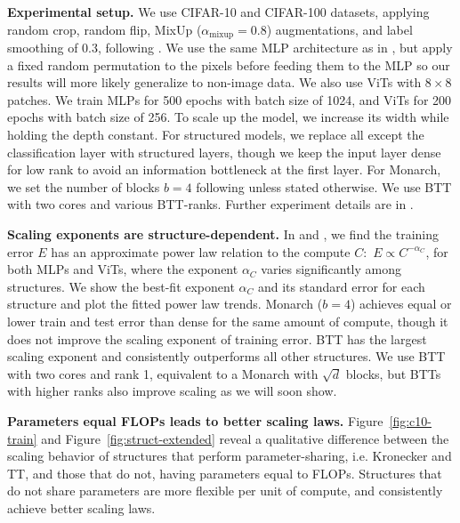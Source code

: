 \documentclass{article}
\theoremstyle{plain}
\theoremstyle{definition}
\theoremstyle{remark}
\begin{document}
\noindent \textbf{Experimental setup.} \quad We use CIFAR-10 and CIFAR-100 datasets, applying random crop, random flip, MixUp ($\alpha_\mathrm{mixup}=0.8$) augmentations, and label smoothing of $0.3$, following \citet{bachmann2023scaling}. We use the same MLP architecture as in \citet{bachmann2023scaling}, but apply a fixed random permutation to the pixels before feeding them to the MLP so our results will more likely generalize to non-image data. We also use ViTs \citep{dosovitskiy2022vit} with $8\times8$ patches. We train MLPs for 500 epochs with batch size of 1024, and ViTs for 200 epochs with batch size of 256. To scale up the model, we increase its width while holding the depth constant.
For structured models, we replace all except the classification layer with structured layers, though we keep the input layer dense for low rank to avoid an information bottleneck at the first layer. For Monarch, we set the number of blocks $b=4$ following  \citet{dao2022monarch} unless stated otherwise. We use BTT with two cores and various BTT-ranks. Further experiment details are in .

\noindent \textbf{Scaling exponents are structure-dependent.} \quad In  and , we find the training error $E$ has an approximate power law relation to the compute $C:$ $E \propto C^{-\alpha_C}$, for both MLPs and ViTs, where the exponent $\alpha_C$ varies significantly among structures. We show the best-fit exponent $\alpha_C$ and its standard error for each structure and plot the fitted power law trends.
Monarch ($b=4$) achieves equal or lower train and test error than dense for the same amount of compute, though it does not improve the scaling exponent of training error. BTT has the largest scaling exponent and consistently outperforms all other structures. We use BTT with two cores and rank 1, equivalent to a Monarch with $\sqrt{d}$ blocks, but BTTs with higher ranks also improve scaling as we will soon show.

\noindent \textbf{Parameters equal FLOPs leads to better scaling laws.} \quad Figure~\ref{fig:c10-train} and Figure~\ref{fig:struct-extended} reveal a qualitative difference between the scaling behavior of structures that perform parameter-sharing, i.e. Kronecker and TT, and those that do not, having parameters equal to FLOPs. Structures that do not share parameters are more flexible per unit of compute, and consistently achieve better scaling laws.
\end{document}
